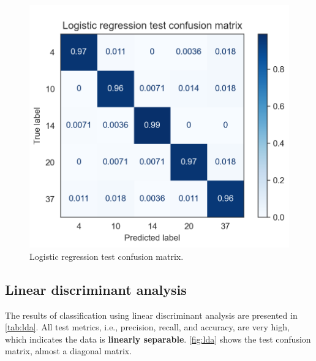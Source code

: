 \documentclass[twocolumn]{article}
\begin{document}
                  \begin{figure}[H]
                        \includegraphics[width=\linewidth]{lr.png}
                        \caption{Logistic regression test confusion matrix.}
                        \label{fig:lr}
                  \end{figure}

            \subsection{Linear discriminant analysis}

                  The results of classification using linear discriminant analysis are presented in \autoref{tab:lda}. All test metrics, i.e., precision, recall, and accuracy, are very high, which indicates the data is \textbf{linearly separable}. \autoref{fig:lda} shows the test confusion matrix, almost a diagonal matrix.
\end{document}
